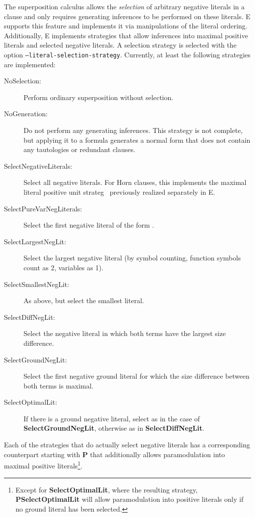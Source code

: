 \documentclass{article}
\begin{document}
The superposition calculus allows the \emph{selection} of arbitrary
negative literals in a clause and only requires generating inferences
to be performed on these literals. E supports this feature and
implements it via manipulations of the literal ordering. Additionally,
E implements strategies that allow inferences into maximal positive
literals and selected negative literals. A selection strategy is
selected with the option \texttt{--literal-selection-strategy}.
Currently, at least the following strategies are implemented:

\begin{description}
\item[NoSelection:] Perform ordinary superposition without selection.
\item[NoGeneration:] Do not perform any generating inferences. This
  strategy is not complete, but applying it to a formula generates a
  normal form that does not contain any tautologies or redundant
  clauses.
\item[SelectNegativeLiterals:] Select all negative literals. For Horn
  clauses, this implements the maximal literal positive unit
  strateg~\cite{Dershowitz:IJCAI-91} previously realized separately in
  E.
\item[SelectPureVarNegLiterals:] Select the first negative literal of
  the form .
\item[SelectLargestNegLit:] Select the largest negative literal (by
  symbol counting, function symbols count as 2, variables as 1).
\item[SelectSmallestNegLit:] As above, but select the smallest
  literal.
\item[SelectDiffNegLit:] Select the negative literal in which both
  terms have the largest size difference.
\item[SelectGroundNegLit:] Select the first negative ground literal
  for which the size difference between both terms is maximal.
\item[SelectOptimalLit:] If there is a ground negative literal, select
  as in the case of \textbf{SelectGroundNegLit}, otherwise as in
  \textbf{SelectDiffNegLit}.
\end{description}

Each of the strategies that do actually select negative literals has a
corresponding counterpart starting with \textbf{P} that additionally
allows paramodulation into maximal positive literals\footnote{Except
  for \textbf{SelectOptimalLit}, where the resulting strategy,
  \textbf{PSelectOptimalLit} will allow paramodulation into positive
  literals only if no ground literal has been selected.}.
\end{document}
